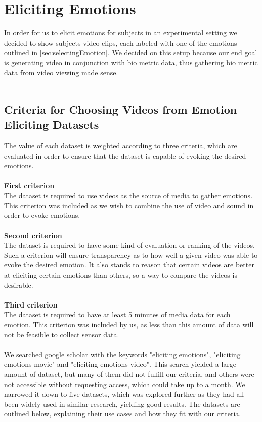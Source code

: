 \section{Eliciting Emotions}
In order for us to elicit emotions for subjects in an experimental setting we decided to show subjects video clips, each labeled with one of the emotions outlined in \cref{sec:selectingEmotion}. We decided on this setup because our end goal is generating video in conjunction with bio metric data, thus gathering bio metric data from video viewing made sense.
\\ \\
\subsection{Criteria for Choosing Videos from Emotion Eliciting Datasets}
The value of each dataset is weighted according to three criteria, which are evaluated in order to ensure that the dataset is capable of evoking the desired emotions.
\\ \\
\textbf{First criterion}\\
The dataset is required to use videos as the source of media to gather emotions. This criterion was included as we wish to combine the use of video and sound in order to evoke emotions.
\\ \\
\textbf{Second criterion}\\
The dataset is required to have some kind of evaluation or ranking of the videos. Such a criterion will ensure transparency as to how well a given video was able to evoke the desired emotion. It also stands to reason that certain videos are better at eliciting certain emotions than others, so a way to compare the videos is desirable.  
\\ \\
\textbf{Third criterion}\\
The dataset is required to have at least 5 minutes of media data for each emotion. This criterion was included by us, as less than this amount of data will not be feasible to collect sensor data.
\\ \\
We searched google scholar with the keywords "eliciting emotions", "eliciting emotions movie" and "eliciting emotions video". This search yielded a large amount of dataset, but many of them did not fulfill our criteria, and others were not accessible without requesting access, which could take up to a month. We narrowed it down to five datasets, which was explored further as they had all been widely used in similar research, yielding good results. The datasets are outlined below, explaining their use cases and how they fit with our criteria.
